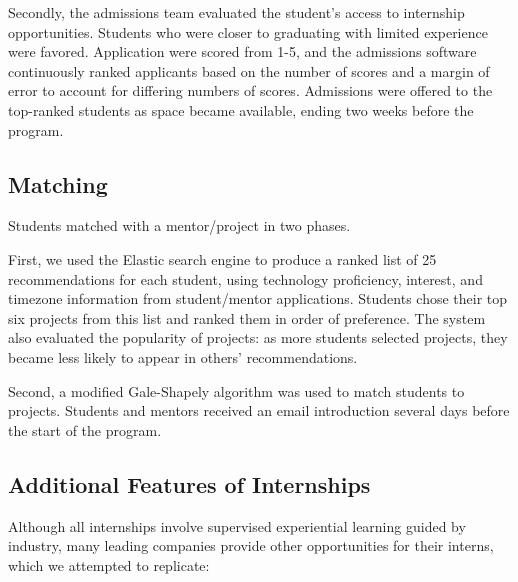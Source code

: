 Secondly, the admissions team evaluated the student’s access to internship opportunities. Students who were closer to graduating with limited experience were favored.
Application were scored from 1-5, and the admissions software continuously ranked applicants based on the number of scores and a margin of error to account for differing numbers of scores. Admissions were offered to the top-ranked students as space became available, ending two weeks before the program.


\subsection{Matching}
Students matched with a mentor/project in two phases.

First, we used the Elastic search engine to produce a ranked list of 25 recommendations for each student, using technology proficiency, interest, and timezone information from student/mentor applications. Students chose their top six projects from this list and ranked them in order of preference. The system also evaluated the popularity of projects: as more students selected projects, they became less likely to appear in others’ recommendations.

Second, a modified Gale-Shapely algorithm \cite{galeCollegeAdmissionsStability1962} was used to match students to projects. Students and mentors received an email introduction several days before the start of the program.



\subsection{Additional Features of Internships}

Although all internships involve supervised experiential learning guided by industry, many leading companies provide other opportunities for their interns, \cite{cunninghamBuildingPremierInternship2012} which we attempted to replicate:

